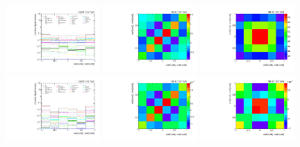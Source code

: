 \begin{figure}[htb]
\begin{center}
 \includegraphics[width=0.32\textwidth]{fig_fullRun2UL/unfolding/combined/deltaSystCombinedlog_rebinnedB_c_Mnr.pdf}
 \includegraphics[width=0.32\textwidth]{fig_fullRun2UL/unfolding/combined/StatCovMatrix_rebinnedB_c_Mnr.pdf}
 \includegraphics[width=0.32\textwidth]{fig_fullRun2UL/unfolding/combined/TotalSystCovMatrix_rebinnedB_c_Mnr.pdf} \\
 \includegraphics[width=0.32\textwidth]{fig_fullRun2UL/unfolding/combined/deltaSystCombinedlogNorm_rebinnedB_c_Mnr.pdf}
 \includegraphics[width=0.32\textwidth]{fig_fullRun2UL/unfolding/combined/StatCovMatrixNorm_rebinnedB_c_Mnr.pdf}
 \includegraphics[width=0.32\textwidth]{fig_fullRun2UL/unfolding/combined/TotalSystCovMatrixNorm_rebinnedB_c_Mnr.pdf} \\

\end{center}
\end{figure}
